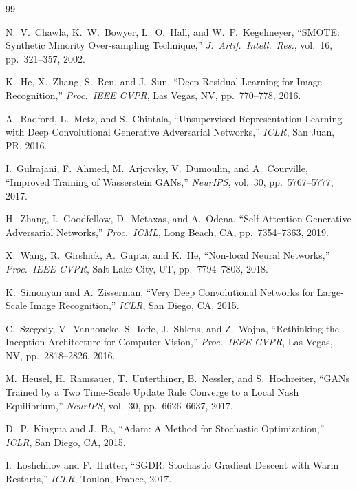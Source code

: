 \documentclass[12pt,letterpaper]{article}
\begin{document}
\newpage
\begin{thebibliography}{99}

N.~V.~Chawla, K.~W.~Bowyer, L.~O.~Hall, and W.~P.~Kegelmeyer,
``SMOTE: Synthetic Minority Over-sampling Technique,''
\textit{J.\ Artif.\ Intell.\ Res.}, vol.~16, pp.~321--357, 2002.

K.~He, X.~Zhang, S.~Ren, and J.~Sun,
``Deep Residual Learning for Image Recognition,''
\textit{Proc.\ IEEE CVPR}, Las Vegas, NV, pp.~770--778, 2016.

A.~Radford, L.~Metz, and S.~Chintala,
``Unsupervised Representation Learning with Deep Convolutional Generative
Adversarial Networks,''
\textit{ICLR}, San Juan, PR, 2016.

I.~Gulrajani, F.~Ahmed, M.~Arjovsky, V.~Dumoulin, and A.~Courville,
``Improved Training of Wasserstein GANs,''
\textit{NeurIPS}, vol.~30, pp.~5767--5777, 2017.

H.~Zhang, I.~Goodfellow, D.~Metaxas, and A.~Odena,
``Self-Attention Generative Adversarial Networks,''
\textit{Proc.\ ICML}, Long Beach, CA, pp.~7354--7363, 2019.

X.~Wang, R.~Girshick, A.~Gupta, and K.~He,
``Non-local Neural Networks,''
\textit{Proc.\ IEEE CVPR}, Salt Lake City, UT, pp.~7794--7803, 2018.

K.~Simonyan and A.~Zisserman,
``Very Deep Convolutional Networks for Large-Scale Image Recognition,''
\textit{ICLR}, San Diego, CA, 2015.

C.~Szegedy, V.~Vanhoucke, S.~Ioffe, J.~Shlens, and Z.~Wojna,
``Rethinking the Inception Architecture for Computer Vision,''
\textit{Proc.\ IEEE CVPR}, Las Vegas, NV, pp.~2818--2826, 2016.

M.~Heusel, H.~Ramsauer, T.~Unterthiner, B.~Nessler, and S.~Hochreiter,
``GANs Trained by a Two Time-Scale Update Rule Converge to a Local
Nash Equilibrium,''
\textit{NeurIPS}, vol.~30, pp.~6626--6637, 2017.

D.~P.~Kingma and J.~Ba,
``Adam: A Method for Stochastic Optimization,''
\textit{ICLR}, San Diego, CA, 2015.

I.~Loshchilov and F.~Hutter,
``SGDR: Stochastic Gradient Descent with Warm Restarts,''
\textit{ICLR}, Toulon, France, 2017.


\end{thebibliography}
\end{document}
